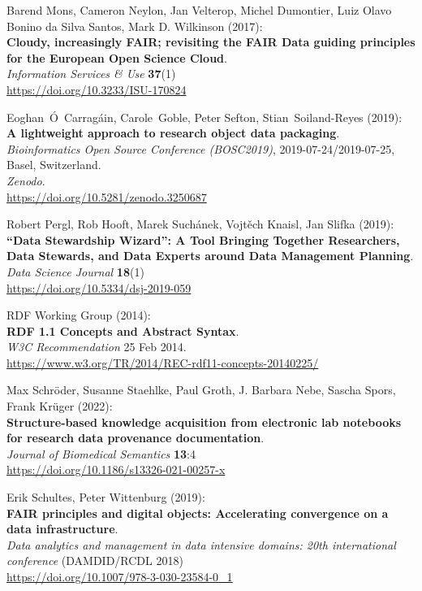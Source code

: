 \begin{thebibliography}{9}
Barend Mons, Cameron Neylon, Jan Velterop, Michel
Dumontier, Luiz Olavo Bonino da Silva Santos, Mark D. Wilkinson
(2017):\\
\textbf{Cloudy, increasingly FAIR; revisiting the FAIR Data guiding
principles for the European Open Science Cloud}.\\
\emph{Information Services \& Use} \textbf{37}(1)\\
\url{https://doi.org/10.3233/ISU-170824}

Eoghan~Ó~Carragáin, Carole~Goble, Peter Sefton,
Stian~Soiland-Reyes (2019):\\
\textbf{A lightweight approach to research object data packaging}.\\
\emph{Bioinformatics Open Source Conference (BOSC2019)},
2019-07-24/2019-07-25, Basel, Switzerland.\\
\emph{Zenodo}.\\
\url{https://doi.org/10.5281/zenodo.3250687}

Robert Pergl, Rob Hooft, Marek Suchánek, Vojtěch
Knaisl, Jan Slifka (2019):\\
\textbf{``Data Stewardship Wizard'': A Tool Bringing Together
Researchers, Data Stewards, and Data Experts around Data Management
Planning}.\\
\emph{Data Science Journal} \textbf{18}(1)\\
\url{https://doi.org/10.5334/dsj-2019-059}

RDF Working Group (2014):\\
\textbf{RDF 1.1 Concepts and Abstract Syntax}.\\
\emph{W3C Recommendation} 25 Feb 2014.\\
\url{https://www.w3.org/TR/2014/REC-rdf11-concepts-20140225/}

Max Schröder, Susanne Staehlke, Paul Groth, J.
Barbara Nebe, Sascha Spors, Frank Krüger (2022):\\
\textbf{Structure-based knowledge acquisition from electronic lab
notebooks for research data provenance documentation}.\\
\emph{Journal of Biomedical Semantics} \textbf{13}:4\\
\url{https://doi.org/10.1186/s13326-021-00257-x}

Erik Schultes, Peter Wittenburg (2019):\\
\textbf{FAIR principles and digital objects: Accelerating convergence on
a data infrastructure}.\\
\emph{Data analytics and management in data intensive domains: 20th
international conference} (DAMDID/RCDL 2018)\\
\url{https://doi.org/10.1007/978-3-030-23584-0_1}


\end{thebibliography}
